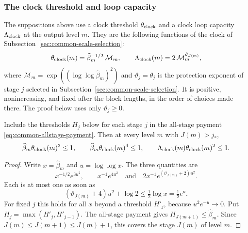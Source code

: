 \subsubsection{The clock threshold and loop capacity}
\label{subsec:rank-root-clock-threshold}

The suppositions above use a clock threshold $\theta_{\rm clock}$ and a
clock loop capacity $\Lambda_{\rm clock}$ at the output level $m$. They
are the following functions of the clock of
Subsection~\ref{sec:common-scale-selection}:
\[
 \theta_{\rm clock}(m)=\widehat\beta_m^{-1/2}\,\mathcal M_m,\qquad
 \Lambda_{\rm clock}(m)=2\,\mathcal M_m^{\vartheta_{J(m)}},
\]
where $\mathcal M_m=\exp((\log\log\widehat\beta_m)^2)$ and
$\vartheta_j=\theta_j$ is the protection exponent of stage $j$ selected in
Subsection~\ref{sec:common-scale-selection}. It is positive, nonincreasing,
and fixed after the block lengths, in the order of choices made there.
The proof below uses only $\vartheta_j\ge0$.

\begin{lemma}
\label{lem:rank-root-late-scale}
Include the thresholds $H_j$ below for each stage $j$ in
the all-stage payment \eqref{eq:common-allstage-payment}. Then at every
level $m$ with $J(m)>j_*$,
\[
 \widehat\beta_m\theta_{\rm clock}(m)^3\le1,\qquad
 \widehat\beta_m\theta_{\rm clock}(m)^4\le1,\qquad
 \Lambda_{\rm clock}(m)\theta_{\rm clock}(m)^2\le1 .
\]
\end{lemma}
\begin{proof}
Write $x=\widehat\beta_m$ and $u=\log\log x$. The three quantities are
\[
 x^{-1/2}e^{3u^2},\qquad x^{-1}e^{4u^2}\quad\text{and}\quad
 2x^{-1}e^{(\vartheta_{J(m)}+2)u^2}.
\] Each is at most one as soon as
\[
 (\vartheta_{J(m)}+4)u^2+\log2\le\tfrac12\log x=\tfrac12e^{u}.
\] For fixed
$j$ this holds for all $x$ beyond a threshold $H'_j$, because
$u^2e^{-u}\to0$. Put $H_j=\max(H'_j,H'_{j-1})$. The all-stage payment
gives $H_{J(m+1)}\le\widehat\beta_m$. Since $J(m)\le J(m+1)\le J(m)+1$,
this covers the stage $J(m)$ of level $m$.
\end{proof}
